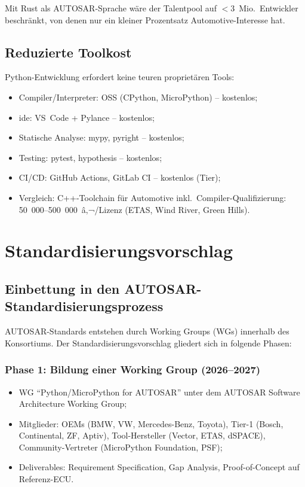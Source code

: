 ﻿\documentclass[12pt,a4paper,twoside]{article}
\begin{document}
Mit Rust als AUTOSAR-Sprache wäre der Talentpool auf $<$3~Mio.\ Entwickler
beschränkt, von denen nur ein kleiner Prozentsatz Automotive-Interesse hat.

\subsection{Reduzierte Toolkost}
\label{subsec:toolkosten}

Python-Entwicklung erfordert keine teuren proprietären Tools:
\begin{itemize}
  \item Compiler/Interpreter: OSS (CPython, MicroPython) -- kostenlos;
  \item \gls{ide}: VS~Code + Pylance -- kostenlos;
  \item Statische Analyse: mypy, pyright -- kostenlos;
  \item Testing: pytest, hypothesis -- kostenlos;
  \item CI/CD: GitHub Actions, GitLab CI -- kostenlos (Tier);
  \item Vergleich: C++-Toolchain für Automotive inkl.\ Compiler-Qualifizierung:
        50~000--500~000~â‚¬/Lizenz (ETAS, Wind River, Green Hills).
\end{itemize}

\section{Standardisierungsvorschlag}
\label{sec:standardisierung}

\subsection{Einbettung in den AUTOSAR-Standardisierungsprozess}
\label{subsec:standardprozess}

AUTOSAR-Standards entstehen durch Working Groups (WGs) innerhalb des
Konsortiums. Der Standardisierungsvorschlag gliedert sich in folgende Phasen:

\subsubsection{Phase 1: Bildung einer Working Group (2026--2027)}
\begin{itemize}
  \item WG ``Python/MicroPython for AUTOSAR'' unter dem
        AUTOSAR Software Architecture Working Group;
  \item Mitglieder: OEMs (BMW, VW, Mercedes-Benz, Toyota),
        Tier-1 (Bosch, Continental, ZF, Aptiv),
        Tool-Hersteller (Vector, ETAS, dSPACE),
        Community-Vertreter (MicroPython Foundation, PSF);
  \item Deliverables: Requirement Specification, Gap Analysis,
        Proof-of-Concept auf Referenz-ECU.
\end{itemize}
\end{document}
